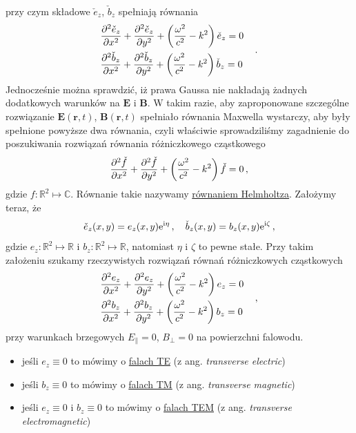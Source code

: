 \documentclass[../main.tex]{subfiles}
\begin{document}
przy czym składowe \(\check e_z\), \(\check b_z\) spełniają równania
\begin{equation*}
    \begin{split}
        &\pdv[2]{\check e_z}{x}+\pdv[2]{\check e_z}{y}+\left(\frac{\omega^2}{c^2}-k^2\right)\check e_z=0\\
        &\pdv[2]{\check b_z}{x}+\pdv[2]{\check b_z}{y}+\left(\frac{\omega^2}{c^2}-k^2\right)\check b_z=0
    \end{split}\quad\,.
\end{equation*}
Jednocześnie można sprawdzić, iż prawa Gaussa nie nakładają żadnych dodatkowych warunków na \(\mathbf{E}\) i \(\mathbf{B}\). W takim razie, aby zaproponowane szczególne rozwiązanie \(\mathbf{E}(\mathbf{r},t)\), \(\mathbf{B}(\mathbf{r},t)\) spełniało równania Maxwella wystarczy, aby były spełnione powyższe dwa równania, czyli właściwie sprowadziliśmy zagadnienie do poszukiwania rozwiązań równania różniczkowego cząstkowego
\begin{equation*}
    \pdv[2]{\check f}{x}+\pdv[2]{\check f}{y}+\left(\frac{\omega^2}{c^2}-k^2\right)\check f=0\,,
\end{equation*}
gdzie \(f:\mathbb{R}^2\mapsto\mathbb{C}\). Równanie takie nazywamy \underline{równaniem Helmholtza}. Założymy teraz, że
\begin{equation*}
    \check e_z(x,y)=e_z(x,y)\mathrm{e}^{\mathrm{i}\eta}\,,\quad \check b_z(x,y)=b_z(x,y)\mathrm{e}^{\mathrm{i}\zeta}\,,
\end{equation*}
gdzie \(e_z:\mathbb{R}^2\mapsto\mathbb{R}\) i \(b_z:\mathbb{R}^2\mapsto\mathbb{R}\), natomiast \(\eta\) i \(\zeta\) to pewne stałe. Przy takim założeniu szukamy rzeczywistych rozwiązań równań różniczkowych cząstkowych
\begin{equation*}
    \begin{split}
        &\pdv[2]{e_z}{x}+\pdv[2]{e_z}{y}+\left(\frac{\omega^2}{c^2}-k^2\right)e_z=0\\
        &\pdv[2]{b_z}{x}+\pdv[2]{b_z}{y}+\left(\frac{\omega^2}{c^2}-k^2\right)b_z=0
    \end{split}\quad\,,
\end{equation*}
przy warunkach brzegowych \(E_\parallel=0\), \(B_\perp=0\) na powierzchni falowodu.
\begin{itemize}
    \item jeśli \(e_z\equiv 0\) to mówimy o \underline{falach TE} (z ang. \textit{transverse electric})
    \item jeśli \(b_z\equiv 0\) to mówimy o \underline{falach TM} (z ang. \textit{transverse magnetic})
    \item jeśli \(e_z\equiv 0\) i \(b_z\equiv 0\) to mówimy o \underline{falach TEM} (z ang. \textit{transverse electromagnetic})
\end{itemize}
\end{document}
